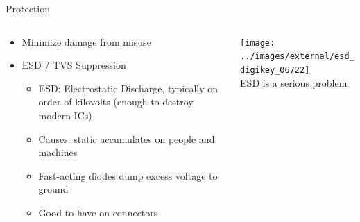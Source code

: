 \documentclass{beamer}
\begin{document}
\begin{frame}{Protection}
  \begin{columns}[T]
    \begin{column}{.6\textwidth}
      \begin{itemize}
        \item Minimize damage from misuse
        \item ESD / TVS Suppression
        \begin{itemize}
          \item ESD: Electrostatic Discharge, typically on order of kilovolts (enough to destroy modern ICs)
          \item Causes: static accumulates on people and machines
          \item Fast-acting diodes dump excess voltage to ground
          \item Good to have on connectors
        \end{itemize}
      \end{itemize}
    \end{column}

    \begin{column}{0.4\textwidth} \centering
      \texttt{[image: ../images/external/esd\_digikey\_06722]} \\
      ESD is a serious problem
    \end{column}
  \end{columns}
\end{frame}
\end{document}
